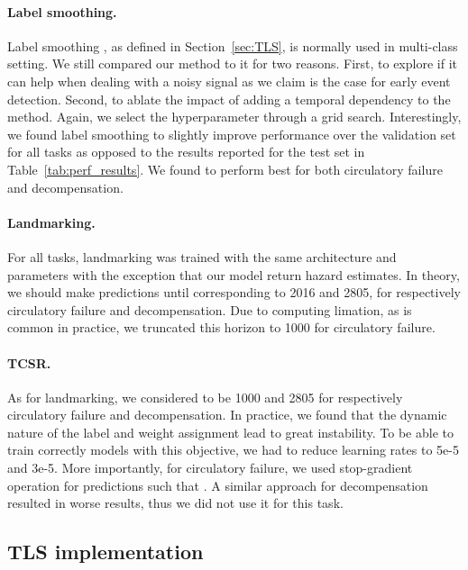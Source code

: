 \documentclass[nohyperref]{article}
\begin{document}
\paragraph{Label smoothing.} Label smoothing \citep{DBLP:conf/cvpr/SzegedyVISW16}, as defined in Section~\ref{sec:TLS}, is normally used in multi-class setting. We still compared our method to it for two reasons. First, to explore if it can help when dealing with a noisy signal as we claim is the case for early event detection. Second, to ablate the impact of adding a temporal dependency to the method. Again, we select the hyperparameter  through a grid search. Interestingly, we found label smoothing to slightly improve performance over the validation set for all tasks as opposed to the results reported for the test set in Table~\ref{tab:perf_results}. We found  to perform best for both {circulatory failure} and {decompensation}.

\paragraph{Landmarking.} For all tasks, landmarking was trained with the same architecture and parameters with the exception that our model return hazard estimates. In theory, we should make predictions until  corresponding to 2016 and 2805, for respectively circulatory failure and decompensation. Due to computing limation, as is common in practice, we truncated this horizon to 1000 for circulatory failure.


\paragraph{TCSR.}
As for landmarking, we considered  to be 1000 and 2805 for respectively circulatory failure and decompensation. In practice, we found that the dynamic nature of the label and weight assignment lead to great instability. To be able to train correctly models with this objective, we had to reduce learning rates to 5e-5 and 3e-5. More importantly, for circulatory failure, we used stop-gradient operation for predictions such that . A similar approach for decompensation resulted in worse results, thus we did not use it for this task.

\subsection{TLS implementation}
\end{document}
